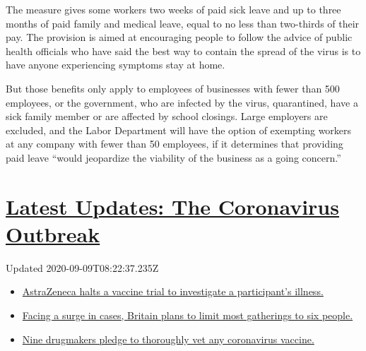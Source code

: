 The measure gives some workers two weeks of paid sick leave and up to
three months of paid family and medical leave, equal to no less than
two-thirds of their pay. The provision is aimed at encouraging people to
follow the advice of public health officials who have said the best way
to contain the spread of the virus is to have anyone experiencing
symptoms stay at home.

But those benefits only apply to employees of businesses with fewer than
500 employees, or the government, who are infected by the virus,
quarantined, have a sick family member or are affected by school
closings. Large employers are excluded, and the Labor Department will
have the option of exempting workers at any company with fewer than 50
employees, if it determines that providing paid leave ``would jeopardize
the viability of the business as a going concern.''

\hypertarget{latest-updates-the-coronavirus-outbreak}{%
\section{\texorpdfstring{\href{https://www.nytimes3xbfgragh.onion/2020/09/08/world/covid-19-coronavirus.html?action=click\&pgtype=Article\&state=default\&region=MAIN_CONTENT_1\&context=storylines_live_updates}{Latest
Updates: The Coronavirus
Outbreak}}{Latest Updates: The Coronavirus Outbreak}}\label{latest-updates-the-coronavirus-outbreak}}

Updated 2020-09-09T08:22:37.235Z

\begin{itemize}
\tightlist
\item
  \href{https://www.nytimes3xbfgragh.onion/2020/09/08/world/covid-19-coronavirus.html?action=click\&pgtype=Article\&state=default\&region=MAIN_CONTENT_1\&context=storylines_live_updates\#link-313b443d}{AstraZeneca
  halts a vaccine trial to investigate a participant's illness.}
\item
  \href{https://www.nytimes3xbfgragh.onion/2020/09/08/world/covid-19-coronavirus.html?action=click\&pgtype=Article\&state=default\&region=MAIN_CONTENT_1\&context=storylines_live_updates\#link-4438dd7}{Facing
  a surge in cases, Britain plans to limit most gatherings to six
  people.}
\item
  \href{https://www.nytimes3xbfgragh.onion/2020/09/08/world/covid-19-coronavirus.html?action=click\&pgtype=Article\&state=default\&region=MAIN_CONTENT_1\&context=storylines_live_updates\#link-679303d7}{Nine
  drugmakers pledge to thoroughly vet any coronavirus vaccine.}
\end{itemize}

